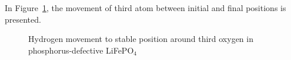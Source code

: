 In Figure~\ref{O3Finitialfinal}, the movement of third atom between initial and final positions is presented.

\begin{figure}[h!]
\begin{minipage}[h]{0.5\linewidth}
\end{minipage}
\hfill
\begin{minipage}[h]{0.5\linewidth}
\end{minipage}
\caption{Hydrogen movement to stable position around third oxygen in phosphorus-defective LiFePO$_4$}
\label{O3Finitialfinal}
\end{figure} 

